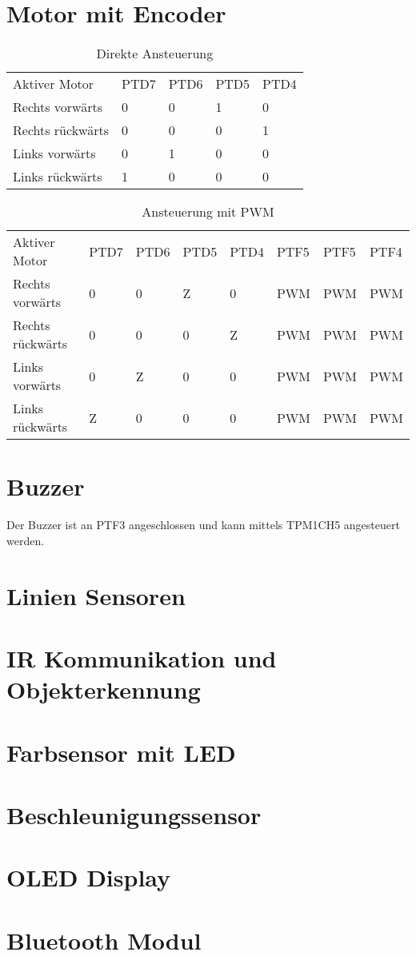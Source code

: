 \documentclass[a4paper,10pt,fleqn]{article}
\begin{document}
\section{Motor mit Encoder}
\begin{table}[h!]
\begin{tabular}{lllll}
\rowcolor{white} Aktiver Motor      & PTD7  & PTD6  & PTD5  & PTD4  \\
\rowcolor{lgray} Rechts vorwärts    & 0     & 0     & 1     & 0     \\
\rowcolor{white} Rechts rückwärts   & 0     & 0     & 0     & 1     \\
\rowcolor{lgray} Links vorwärts     & 0     & 1     & 0     & 0     \\
\rowcolor{white} Links rückwärts    & 1     & 0     & 0     & 0     \\
\end{tabular}
\caption{Direkte Ansteuerung}
\end{table}
\begin{table}[h!]
\begin{tabular}{lllllll}
 Aktiver Motor      & PTD7  & PTD6  & PTD5  & PTD4  & PTF5  & PTF5  & PTF4  \\
 Rechts vorwärts    & 0     & 0     & Z     & 0     & PWM   & PWM   & PWM   \\
 Rechts rückwärts   & 0     & 0     & 0     & Z     & PWM   & PWM   & PWM   \\
 Links vorwärts     & 0     & Z     & 0     & 0     & PWM   & PWM   & PWM   \\
 Links rückwärts    & Z     & 0     & 0     & 0     & PWM   & PWM   & PWM   \\
\end{tabular}
\caption{Ansteuerung mit PWM}
\end{table}

\section{Buzzer}
Der Buzzer ist an PTF3 angeschlossen und kann mittels TPM1CH5 angesteuert 
werden. 

\section{Linien Sensoren}

\section{IR Kommunikation und Objekterkennung}

\section{Farbsensor mit LED}

\section{Beschleunigungssensor}

\section{OLED Display}

\section{Bluetooth Modul}
\end{document}
